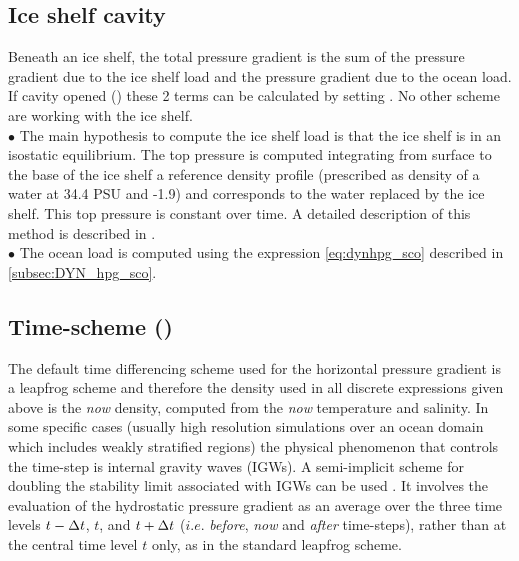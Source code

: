 \documentclass[../tex_main/NEMO_manual]{subfiles}
\begin{document}
\subsection{Ice shelf cavity}
\label{subsec:DYN_hpg_isf}
Beneath an ice shelf, the total pressure gradient is the sum of the pressure gradient due to the ice shelf load and
the pressure gradient due to the ocean load.
If cavity opened () these 2 terms can be calculated by
setting .
No other scheme are working with the ice shelf.\\

$\bullet$ The main hypothesis to compute the ice shelf load is that the ice shelf is in an isostatic equilibrium.
The top pressure is computed integrating from surface to the base of the ice shelf a reference density profile
(prescribed as density of a water at 34.4 PSU and -1.9\degC) and
corresponds to the water replaced by the ice shelf.
This top pressure is constant over time.
A detailed description of this method is described in \citet{Losch2008}.\\

$\bullet$ The ocean load is computed using the expression \autoref{eq:dynhpg_sco} described in
\autoref{subsec:DYN_hpg_sco}. 

\subsection{Time-scheme (\protect{})}
\label{subsec:DYN_hpg_imp}

The default time differencing scheme used for the horizontal pressure gradient is a leapfrog scheme and
therefore the density used in all discrete expressions given above is the  \textit{now} density,
computed from the \textit{now} temperature and salinity.
In some specific cases
(usually high resolution simulations over an ocean domain which includes weakly stratified regions)
the physical phenomenon that controls the time-step is internal gravity waves (IGWs).
A semi-implicit scheme for doubling the stability limit associated with IGWs can be used
\citep{Brown_Campana_MWR78, Maltrud1998}.
It involves the evaluation of the hydrostatic pressure gradient as
an average over the three time levels $t-\Delta t$, $t$, and $t+\Delta t$
($i.e.$  \textit{before},  \textit{now} and  \textit{after} time-steps),
rather than at the central time level $t$ only, as in the standard leapfrog scheme. 
\end{document}
